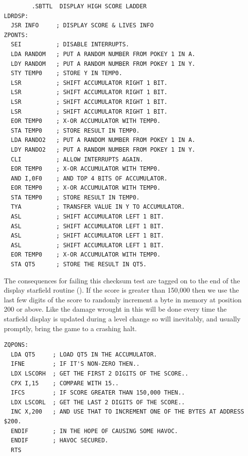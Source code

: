 \begin{lstlisting}
        .SBTTL  DISPLAY HIGH SCORE LADDER
LDRDSP: 
  JSR INFO     ; DISPLAY SCORE & LIVES INFO
ZPONTS:
  SEI          ; DISABLE INTERRUPTS.
  LDA RANDOM   ; PUT A RANDOM NUMBER FROM POKEY 1 IN A. 
  LDY RANDOM   ; PUT A RANDOM NUMBER FROM POKEY 1 IN Y. 
  STY TEMP0    ; STORE Y IN TEMP0.
  LSR          ; SHIFT ACCUMULATOR RIGHT 1 BIT.
  LSR          ; SHIFT ACCUMULATOR RIGHT 1 BIT.
  LSR          ; SHIFT ACCUMULATOR RIGHT 1 BIT.
  LSR          ; SHIFT ACCUMULATOR RIGHT 1 BIT.
  EOR TEMP0    ; X-OR ACCUMULATOR WITH TEMP0.
  STA TEMP0    ; STORE RESULT IN TEMP0.
  LDA RANDO2   ; PUT A RANDOM NUMBER FROM POKEY 1 IN A. 
  LDY RANDO2   ; PUT A RANDOM NUMBER FROM POKEY 1 IN Y. 
  CLI          ; ALLOW INTERRUPTS AGAIN.
  EOR TEMP0    ; X-OR ACCUMULATOR WITH TEMP0.
  AND I,0F0    ; AND TOP 4 BITS OF ACCUMULATOR.
  EOR TEMP0    ; X-OR ACCUMULATOR WITH TEMP0. 
  STA TEMP0    ; STORE RESULT IN TEMP0.
  TYA          ; TRANSFER VALUE IN Y TO ACCUMULATOR.
  ASL          ; SHIFT ACCUMULATOR LEFT 1 BIT.
  ASL          ; SHIFT ACCUMULATOR LEFT 1 BIT.
  ASL          ; SHIFT ACCUMULATOR LEFT 1 BIT.
  ASL          ; SHIFT ACCUMULATOR LEFT 1 BIT.
  EOR TEMP0    ; X-OR ACCUMULATOR WITH TEMP0. 
  STA QT5      ; STORE THE RESULT IN QT5.
\end{lstlisting}

The consequences for failing this checksum test are tagged on to the end of the display starfield routine (). 
If the score is greater than 150,000 then we use the last few digits of the score
to randomly increment a byte in memory at position 200 or above. Like the damage
wrought in  this will be done every time the starfield display is updated
during a level change so will inevitably, and usually promptly, bring the game to a crashing
halt.

\clearpage
\begin{lstlisting}
ZQPONS: 
  LDA QT5     ; LOAD QT5 IN THE ACCUMULATOR.
  IFNE        ; IF IT'S NON-ZERO THEN..
  LDX LSCORH  ; GET THE FIRST 2 DIGITS OF THE SCORE..
  CPX I,15    ; COMPARE WITH 15..
  IFCS        ; IF SCORE GREATER THAN 150,000 THEN..
  LDX LSCORL  ; GET THE LAST 2 DIGITS OF THE SCORE..
  INC X,200   ; AND USE THAT TO INCREMENT ONE OF THE BYTES AT ADDRESS $200. 
  ENDIF       ; IN THE HOPE OF CAUSING SOME HAVOC.
  ENDIF       ; HAVOC SECURED.
  RTS
\end{lstlisting}

